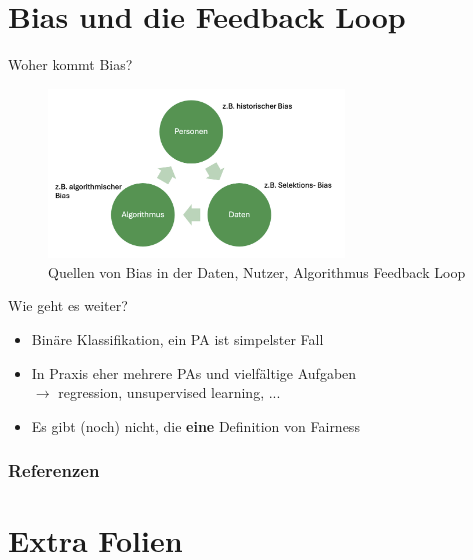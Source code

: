 \documentclass[aspectratio=169]{beamer}
\begin{document}
\section{Bias und die Feedback Loop}
\begin{frame}{Woher kommt Bias?}
	\begin{figure}
		\centering
		\includegraphics[width=0.7\textwidth]{../figures/bias_loop.png}
		\caption{Quellen von Bias in der Daten, Nutzer, Algorithmus Feedback Loop \cite{mehrabi2022}}
	\end{figure}
\end{frame}

\begin{frame}{Wie geht es weiter?}
	\begin{itemize}
		\item<1-> Binäre Klassifikation, ein PA ist simpelster Fall
		\item<2-> In Praxis eher mehrere PAs und vielfältige Aufgaben\\ $\rightarrow$ regression, unsupervised learning, ...
		\item<3-> Es gibt (noch) nicht, die \textbf{eine} Definition von Fairness
	\end{itemize}
\end{frame}

\begin{frame}[allowframebreaks]
	\frametitle{Referenzen}
	\printbibliography
\end{frame}

\section{Extra Folien}
\end{document}
